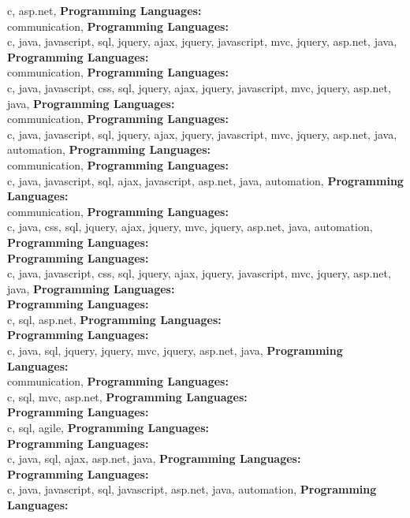 c, asp.net, \textbf{Programming Languages:} \\
communication, \textbf{Programming Languages:} \\
c, java, javascript, sql, jquery, ajax,  jquery, javascript, mvc, jquery, asp.net, java, \textbf{Programming Languages:} \\
communication, \textbf{Programming Languages:} \\
c, java, javascript, css, sql, jquery, ajax,  jquery, javascript, mvc, jquery, asp.net, java, \textbf{Programming Languages:} \\
communication, \textbf{Programming Languages:} \\
c, java, javascript, sql, jquery, ajax,  jquery, javascript, mvc, jquery, asp.net, java, automation, \textbf{Programming Languages:} \\
communication, \textbf{Programming Languages:} \\
c, java, javascript, sql, ajax, javascript, asp.net, java, automation, \textbf{Programming Languages:} \\
communication, \textbf{Programming Languages:} \\
c, java, css, sql, jquery, ajax,  jquery, mvc, jquery, asp.net, java, automation, \textbf{Programming Languages:} \\
\textbf{Programming Languages:} \\
c, java, javascript, css, sql, jquery, ajax,  jquery, javascript, mvc, jquery, asp.net, java, \textbf{Programming Languages:} \\
\textbf{Programming Languages:} \\
c, sql, asp.net, \textbf{Programming Languages:} \\
\textbf{Programming Languages:} \\
c, java, sql, jquery,  jquery, mvc, jquery, asp.net, java, \textbf{Programming Languages:} \\
communication, \textbf{Programming Languages:} \\
c, sql, mvc, asp.net, \textbf{Programming Languages:} \\
\textbf{Programming Languages:} \\
c, sql, agile, \textbf{Programming Languages:} \\
\textbf{Programming Languages:} \\
c, java, sql, ajax, asp.net, java, \textbf{Programming Languages:} \\
\textbf{Programming Languages:} \\
c, java, javascript, sql, javascript, asp.net, java, automation, \textbf{Programming Languages:} \\
